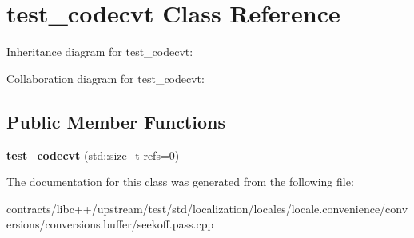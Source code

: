 \hypertarget{classtest__codecvt}{}\section{test\+\_\+codecvt Class Reference}
\label{classtest__codecvt}


Inheritance diagram for test\+\_\+codecvt\+:


Collaboration diagram for test\+\_\+codecvt\+:
\subsection*{Public Member Functions}
\begin{DoxyCompactItemize}
\item 
\mbox{\label{classtest__codecvt_a8861e7e0efa87810d5d51e68ee8af68c}} 
{\bfseries test\+\_\+codecvt} (std\+::size\+\_\+t refs=0)
\end{DoxyCompactItemize}


The documentation for this class was generated from the following file\+:\begin{DoxyCompactItemize}
\item 
contracts/libc++/upstream/test/std/localization/locales/locale.\+convenience/conversions/conversions.\+buffer/seekoff.\+pass.\+cpp\end{DoxyCompactItemize}
